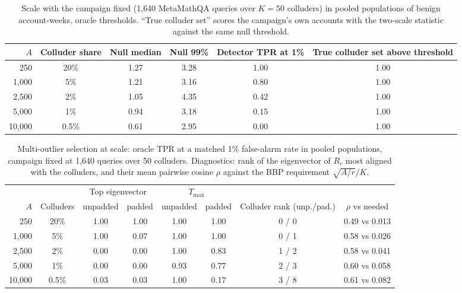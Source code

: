 \begin{table}[h]
\centering
\caption{Scale with the campaign fixed (1{,}640 MetaMathQA queries over $K=50$ colluders) in pooled populations of benign account-weeks, oracle thresholds. ``True colluder set'' scores the campaign's own accounts with the two-scale statistic against the same null threshold.}
\label{tabA:scale10k}
\small
\begin{tabular}{rccccc}
\toprule
$A$ & Colluder share & Null median & Null 99\% & Detector TPR at 1\% & True colluder set above threshold \\
\midrule
250 & 20\% & 1.27 & 3.28 & 1.00 & 1.00 \\
1{,}000 & 5\% & 1.21 & 3.16 & 0.80 & 1.00 \\
2{,}500 & 2\% & 1.05 & 4.35 & 0.42 & 1.00 \\
5{,}000 & 1\% & 0.94 & 3.18 & 0.15 & 1.00 \\
10{,}000 & 0.5\% & 0.61 & 2.95 & 0.00 & 1.00 \\
\bottomrule
\end{tabular}
\end{table}
\begin{table}[h]
\centering
\caption{Multi-outlier selection at scale: oracle TPR at a matched 1\% false-alarm rate in pooled populations, campaign fixed at 1{,}640 queries over 50 colluders. Diagnostics: rank of the eigenvector of $R_c$ most aligned with the colluders, and their mean pairwise cosine $\rho$ against the BBP requirement $\sqrt{A/r}/K$.}
\label{tabA:multi}
\small
\begin{tabular}{rccccccc}
\toprule
& & \multicolumn{2}{c}{Top eigenvector} & \multicolumn{2}{c}{$T_{\max}$} & & \\
\cmidrule(lr){3-4}\cmidrule(lr){5-6}
$A$ & Colluders & unpadded & padded & unpadded & padded & Colluder rank (unp./pad.) & $\rho$ vs needed \\
\midrule
250 & 20\% & 1.00 & 1.00 & 1.00 & 1.00 & 0 / 0 & 0.49 vs 0.013 \\
1{,}000 & 5\% & 1.00 & 0.07 & 1.00 & 1.00 & 0 / 1 & 0.58 vs 0.026 \\
2{,}500 & 2\% & 0.00 & 0.00 & 1.00 & 0.83 & 1 / 2 & 0.58 vs 0.041 \\
5{,}000 & 1\% & 0.00 & 0.00 & 0.93 & 0.77 & 2 / 3 & 0.60 vs 0.058 \\
10{,}000 & 0.5\% & 0.03 & 0.03 & 1.00 & 0.17 & 3 / 8 & 0.61 vs 0.082 \\
\bottomrule
\end{tabular}
\end{table}

